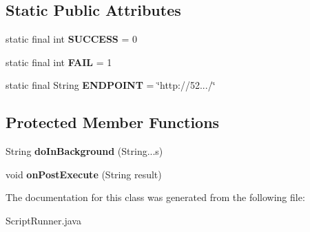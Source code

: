 \subsection*{Static Public Attributes}
\begin{DoxyCompactItemize}
\item 
\hypertarget{classcom_1_1example_1_1sel_1_1lostfound_1_1ScriptRunner_af663271a5e699ad47264102b5445799e}{static final int {\bfseries S\-U\-C\-C\-E\-S\-S} = 0}\label{classcom_1_1example_1_1sel_1_1lostfound_1_1ScriptRunner_af663271a5e699ad47264102b5445799e}

\item 
\hypertarget{classcom_1_1example_1_1sel_1_1lostfound_1_1ScriptRunner_af872e324d4d349db617f9511009901a9}{static final int {\bfseries F\-A\-I\-L} = 1}\label{classcom_1_1example_1_1sel_1_1lostfound_1_1ScriptRunner_af872e324d4d349db617f9511009901a9}

\item 
\hypertarget{classcom_1_1example_1_1sel_1_1lostfound_1_1ScriptRunner_a6b8f5d1e77298c2f260fd7ef9502650d}{static final String {\bfseries E\-N\-D\-P\-O\-I\-N\-T} = \char`\"{}http\-://52.../\char`\"{}}\label{classcom_1_1example_1_1sel_1_1lostfound_1_1ScriptRunner_a6b8f5d1e77298c2f260fd7ef9502650d}

\end{DoxyCompactItemize}
\subsection*{Protected Member Functions}
\begin{DoxyCompactItemize}
\item 
\hypertarget{classcom_1_1example_1_1sel_1_1lostfound_1_1ScriptRunner_a9050c944957b5b8fcacc9d2cba6f3b71}{String {\bfseries do\-In\-Background} (String...\-s)}\label{classcom_1_1example_1_1sel_1_1lostfound_1_1ScriptRunner_a9050c944957b5b8fcacc9d2cba6f3b71}

\item 
\hypertarget{classcom_1_1example_1_1sel_1_1lostfound_1_1ScriptRunner_affce5629df2ecd60a45f3c707b996955}{void {\bfseries on\-Post\-Execute} (String result)}\label{classcom_1_1example_1_1sel_1_1lostfound_1_1ScriptRunner_affce5629df2ecd60a45f3c707b996955}

\end{DoxyCompactItemize}


The documentation for this class was generated from the following file\-:\begin{DoxyCompactItemize}
\item 
Script\-Runner.\-java\end{DoxyCompactItemize}
